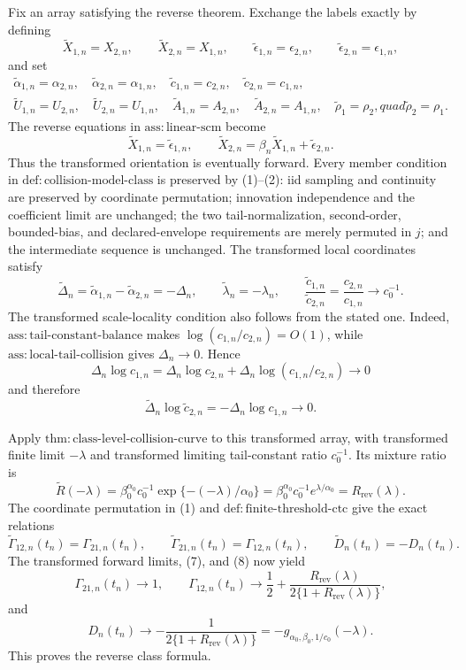 Fix an array satisfying the reverse theorem.  Exchange the labels exactly by defining
\[
\widetilde X_{1,n}=X_{2,n},\qquad
\widetilde X_{2,n}=X_{1,n},\qquad
\widetilde\epsilon_{1,n}=\epsilon_{2,n},\qquad
\widetilde\epsilon_{2,n}=\epsilon_{1,n},
\tag{1}
\]
and set
\[
\begin{gathered}
\widetilde\alpha_{1,n}=\alpha_{2,n},\quad
\widetilde\alpha_{2,n}=\alpha_{1,n},\quad
\widetilde c_{1,n}=c_{2,n},\quad
\widetilde c_{2,n}=c_{1,n},\\
\widetilde U_{1,n}=U_{2,n},\quad
\widetilde U_{2,n}=U_{1,n},\quad
\widetilde A_{1,n}=A_{2,n},\quad
\widetilde A_{2,n}=A_{1,n},\quad
\widetilde\rho_1=\rho_2,quad
\widetilde\rho_2=\rho_1.
\end{gathered}
\tag{2}
\]
The reverse equations in \(\mathrm{ass{:}linear\text{-}scm}\) become
\[
\widetilde X_{1,n}=\widetilde\epsilon_{1,n},
\qquad
\widetilde X_{2,n}=\beta_n\widetilde X_{1,n}+\widetilde\epsilon_{2,n}.
\tag{3}
\]
Thus the transformed orientation is eventually forward.  Every member condition in \(\mathrm{def{:}collision\text{-}model\text{-}class}\) is preserved by (1)--(2): iid sampling and continuity are preserved by coordinate permutation; innovation independence and the coefficient limit are unchanged; the two tail-normalization, second-order, bounded-bias, and declared-envelope requirements are merely permuted in \(j\); and the intermediate sequence is unchanged.  The transformed local coordinates satisfy
\[
\widetilde\Delta_n
=\widetilde\alpha_{1,n}-\widetilde\alpha_{2,n}
=-\Delta_n,
\qquad
\widetilde\lambda_n=-\lambda_n,
\qquad
\frac{\widetilde c_{1,n}}{\widetilde c_{2,n}}
=\frac{c_{2,n}}{c_{1,n}}\longrightarrow c_0^{-1}.
\tag{4}
\]
The transformed scale-locality condition also follows from the stated one.  Indeed, \(\mathrm{ass{:}tail\text{-}constant\text{-}balance}\) makes \(\log(c_{1,n}/c_{2,n})=O(1)\), while \(\mathrm{ass{:}local\text{-}tail\text{-}collision}\) gives \(\Delta_n\to0\).  Hence
\[
\Delta_n\log c_{1,n}
=\Delta_n\log c_{2,n}
+\Delta_n\log(c_{1,n}/c_{2,n})\longrightarrow0
\tag{5}
\]
and therefore
\[
\widetilde\Delta_n\log\widetilde c_{2,n}
=-\Delta_n\log c_{1,n}\longrightarrow0.
\tag{6}
\]

Apply \(\mathrm{thm{:}class\text{-}level\text{-}collision\text{-}curve}\) to this transformed array, with transformed finite limit \(-\lambda\) and transformed limiting tail-constant ratio \(c_0^{-1}\).  Its mixture ratio is
\[
\widetilde R(-\lambda)
=\beta_0^{\alpha_0}c_0^{-1}
\exp\{-(-\lambda)/\alpha_0\}
=\beta_0^{\alpha_0}c_0^{-1}e^{\lambda/\alpha_0}
=R_{\mathrm{rev}}(\lambda).
\tag{7}
\]
The coordinate permutation in (1) and \(\mathrm{def{:}finite\text{-}threshold\text{-}ctc}\) give the exact relations
\[
\widetilde\Gamma_{12,n}(t_n)=\Gamma_{21,n}(t_n),
\qquad
\widetilde\Gamma_{21,n}(t_n)=\Gamma_{12,n}(t_n),
\qquad
\widetilde D_n(t_n)=-D_n(t_n).
\tag{8}
\]
The transformed forward limits, (7), and (8) now yield
\[
\Gamma_{21,n}(t_n)\to1,
\qquad
\Gamma_{12,n}(t_n)\to
\frac12+\frac{R_{\mathrm{rev}}(\lambda)}{2\{1+R_{\mathrm{rev}}(\lambda)\}},
\tag{9}
\]
and
\[
D_n(t_n)\to
-\frac1{2\{1+R_{\mathrm{rev}}(\lambda)\}}
=-g_{\alpha_0,\beta_0,1/c_0}(-\lambda).
\tag{10}
\]
This proves the reverse class formula.

